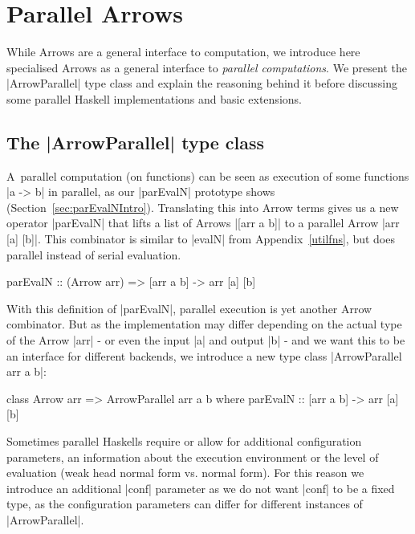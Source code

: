 \section{Parallel Arrows}
\label{sec:parallel-arrows}
While Arrows are a general interface to computation, we introduce here specialised Arrows as a general interface to \textit{parallel computations}. We present the |ArrowParallel| type class and explain the reasoning behind it before discussing some parallel Haskell implementations and basic extensions.
\subsection{The |ArrowParallel| type class}
A~parallel computation (on functions) can be seen as execution of some functions |a -> b| in parallel, as our |parEvalN| prototype shows (Section~\ref{sec:parEvalNIntro}).
Translating this into Arrow terms gives us a new operator |parEvalN| that lifts a list of Arrows |[arr a b]| to a parallel Arrow |arr [a] [b]|. %
This combinator is similar to |evalN| from Appendix~\ref{utilfns}, but does parallel instead of serial evaluation.
\begin{code}
parEvalN :: (Arrow arr) => [arr a b] -> arr [a] [b]
\end{code}
With this definition of |parEvalN|, parallel execution is yet another Arrow combinator. But as the implementation may differ depending on the actual type of the Arrow |arr| - or even the input |a| and output |b| - and we want this to be an interface for different backends, we introduce a new type class |ArrowParallel arr a b|: %
\begin{code}
class Arrow arr => ArrowParallel arr a b where
	parEvalN :: [arr a b] -> arr [a] [b]
\end{code}
Sometimes parallel Haskells require or allow for additional configuration parameters, \eg an information about the execution environment or the level of evaluation (weak head normal form vs. normal form). For this reason we introduce an additional |conf| parameter as we do not want |conf| to be a fixed type, as the configuration parameters can differ for different instances of |ArrowParallel|. %
